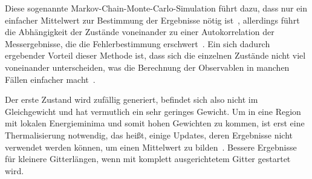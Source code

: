 	Diese sogenannte Markov-Chain-Monte-Carlo-Simulation führt dazu, dass nur ein einfacher Mittelwert zur Bestimmung der Ergebnisse nötig ist~\cite[vgl. ][S. 19 f.]{binderheermann}, allerdings führt die Abhängigkeit der Zustände voneinander zu einer Autokorrelation der Messergebnisse, die die Fehlerbestimmung erschwert~\cite[vgl. ][S. 72 ff.]{skriptcompphys}. Ein sich dadurch ergebender Vorteil dieser Methode ist, dass sich die einzelnen Zustände nicht viel voneinander unterscheiden, was die Berechnung der Observablen in manchen Fällen einfacher macht~\cite[vgl. ][S. 102 f.]{binderheermann}.
	
	Der erste Zustand wird zufällig generiert, befindet sich also nicht im Gleichgewicht und hat vermutlich ein sehr geringes Gewicht. Um in eine Region mit lokalen Energieminima und somit hohen Gewichten zu kommen, ist erst eine Thermalisierung notwendig, das heißt, einige Updates, deren Ergebnisse nicht verwendet werden können, um einen Mittelwert zu bilden~\cite[vgl. ][S. 100 f.]{binderheermann}. %
	Bessere Ergebnisse für kleinere Gitterlängen, wenn mit komplett ausgerichtetem Gitter gestartet wird.
	
	
		

